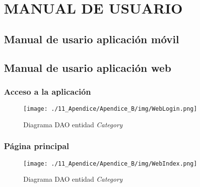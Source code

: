 \chapter[Manual de usuario]{
  \label{chp:manualdeusuario}
  MANUAL DE USUARIO
}
\thispagestyle{numberingStyle}
\pagestyle{numberingStyle}


\section{Manual de usario aplicación móvil}

\section{Manual de usario aplicación web}

\subsection*{Acceso a la aplicación}

\begin{figure}[H]
\centering
\texttt{[image: ./11\_Apendice/Apendice\_B/img/WebLogin.png]}
\caption{Diagrama DAO entidad \textit{Category}}
\end{figure}


\subsection*{Página principal}

\begin{figure}[H]
\centering
\texttt{[image: ./11\_Apendice/Apendice\_B/img/WebIndex.png]}
\caption{Diagrama DAO entidad \textit{Category}}
\end{figure}